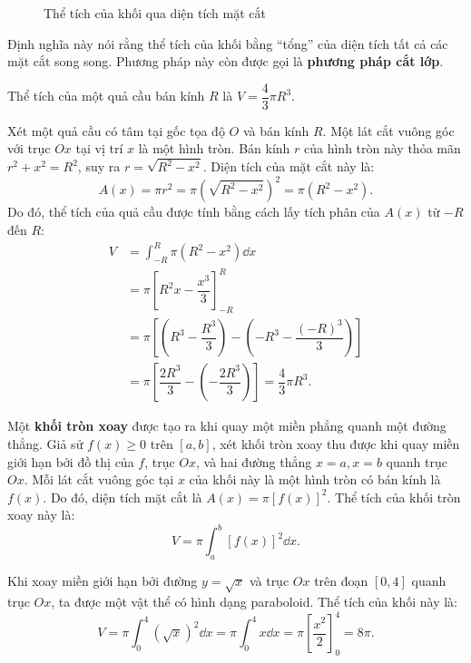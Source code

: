 \begin{figure}[H]
\begin{minipage}{0.45\textwidth}
    \end{minipage}
    \label{fig:volume-cross-section}
    \caption{Thể tích của khối qua diện tích mặt cắt\footnotemark}
\end{figure}

Định nghĩa này nói rằng thể tích của khối bằng ``tổng'' của diện tích tất cả các mặt cắt song song. Phương pháp này còn được gọi là \textbf{phương pháp cắt lớp}.

\begin{example}
    Thể tích của một quả cầu bán kính $R$ là $V = \dfrac{4}{3}\pi R^3$.
\end{example}
\begin{solution}
    Xét một quả cầu có tâm tại gốc tọa độ $O$ và bán kính $R$. Một lát cắt vuông góc với trục $Ox$ tại vị trí $x$ là một hình tròn. Bán kính $r$ của hình tròn này thỏa mãn $r^2 + x^2 = R^2$, suy ra $r = \sqrt{R^2 - x^2}$.
    Diện tích của mặt cắt này là:
    \[ A(x) = \pi r^2 = \pi (\sqrt{R^2 - x^2})^2 = \pi(R^2 - x^2). \]
    Do đó, thể tích của quả cầu được tính bằng cách lấy tích phân của $A(x)$ từ $-R$ đến $R$:
    \begin{align*}
        V &= \int_{-R}^R \pi(R^2 - x^2) \dd x \\
        &= \pi \left[ R^2x - \dfrac{x^3}{3} \right]_{-R}^R \\
        &= \pi \left[ \left(R^3 - \dfrac{R^3}{3}\right) - \left(-R^3 - \dfrac{(-R)^3}{3}\right) \right] \\
        &= \pi \left[ \dfrac{2R^3}{3} - \left(-\dfrac{2R^3}{3}\right) \right] = \dfrac{4}{3}\pi R^3.
    \end{align*}
\end{solution}

\begin{example}
    Một \textbf{khối tròn xoay} được tạo ra khi quay một miền phẳng quanh một đường thẳng. Giả sử $f(x) \ge 0$ trên $[a, b]$, xét khối tròn xoay thu được khi quay miền giới hạn bởi đồ thị của $f$, trục $Ox$, và hai đường thẳng $x=a, x=b$ quanh trục $Ox$. Mỗi lát cắt vuông góc tại $x$ của khối này là một hình tròn có bán kính là $f(x)$. Do đó, diện tích mặt cắt là $A(x) = \pi [f(x)]^2$. Thể tích của khối tròn xoay này là:
    \[ V = \pi \int_a^b [f(x)]^2 \dd x. \]
\end{example}

\begin{example}
    Khi xoay miền giới hạn bởi đường $y = \sqrt{x}$ và trục $Ox$ trên đoạn $[0, 4]$ quanh trục $Ox$, ta được một vật thể có hình dạng paraboloid. Thể tích của khối này là:
    \[ V = \pi \int_0^4 (\sqrt{x})^2 \dd x = \pi \int_0^4 x \dd x = \pi \left[\dfrac{x^2}{2}\right]_0^4 = 8\pi. \]
\end{example}

